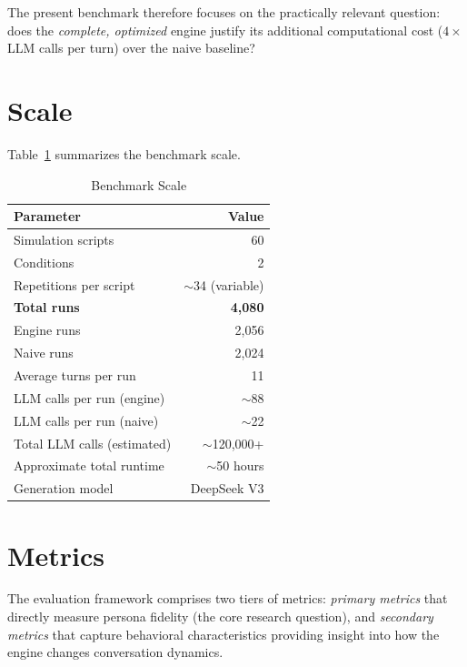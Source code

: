 The present benchmark therefore focuses on the practically relevant question: does the \textit{complete, optimized} engine justify its additional computational cost ($4\times$ LLM calls per turn) over the naive baseline?


\section{Scale}

Table~\ref{tab:scale} summarizes the benchmark scale.

\begin{table}[t]
\centering
\caption{Benchmark Scale}
\label{tab:scale}
\begin{tabular}{lr}
\toprule
Parameter & Value \\
\midrule
Simulation scripts                & 60 \\
Conditions                        & 2 \\
Repetitions per script            & $\sim$34 (variable) \\
\textbf{Total runs}               & \textbf{4,080} \\
  \quad Engine runs               & 2,056 \\
  \quad Naive runs                & 2,024 \\
Average turns per run             & 11 \\
LLM calls per run (engine)       & $\sim$88 \\
LLM calls per run (naive)        & $\sim$22 \\
Total LLM calls (estimated)      & $\sim$120,000+ \\
Approximate total runtime         & $\sim$50 hours \\
Generation model                  & DeepSeek V3 \\
\bottomrule
\end{tabular}
\end{table}


\section{Metrics}
\label{sec:metrics}

The evaluation framework comprises two tiers of metrics: \textit{primary metrics} that directly measure persona fidelity (the core research question), and \textit{secondary metrics} that capture behavioral characteristics providing insight into how the engine changes conversation dynamics.

